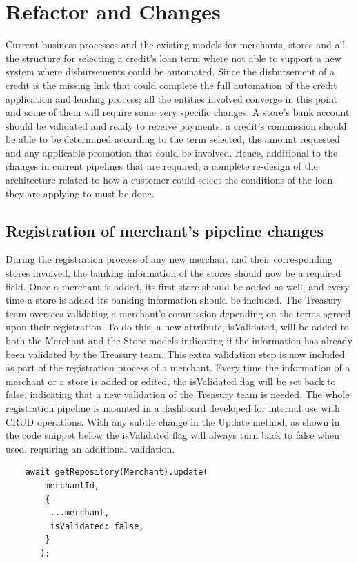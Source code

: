 \section{Refactor and Changes}
Current business processes and the existing models for merchants, stores and all the structure for selecting a credit’s loan term where not able to support a new system where disbursements could be automated. Since the disbursement of a credit is the missing link that could complete the full automation of the credit application and lending process, all the entities involved converge in this point and some of them will require some very specific changes: A store’s bank account should be validated and ready to receive payments, a credit’s commission should be able to be determined according to the term selected, the amount requested and any applicable promotion that could be involved. Hence, additional to the changes in current pipelines that are required, a complete re-design of the architecture related to how a customer could select the conditions of the loan they are applying to must be done.

\subsection{Registration of merchant’s pipeline changes}
During the registration process of any new merchant and their corresponding stores involved, the banking information of the stores should now be a required field. Once a merchant is added, its first store should be added as well, and every time a store is added its banking information should be included.
The Treasury team oversees validating a merchant’s commission depending on the terms agreed upon their registration. To do this, a new attribute, isValidated, will be added to both the Merchant and the Store models indicating if the information has already been validated by the Treasury team. This extra validation step is now included as part of the registration process of a merchant. Every time the information of a merchant or a store is added or edited, the isValidated flag will be set back to false, indicating that a new validation of the Treasury team is needed.
The whole registration pipeline is mounted in a dashboard developed for internal use with CRUD operations. With any subtle change in the Update method, as shown in the code snippet below the isValidated flag will always turn back to false when used, requiring an additional validation.

\begin{verbatim}
    await getRepository(Merchant).update(
        merchantId,
        {
         ...merchant,
         isValidated: false,
        }
       );
       
\end{verbatim}

